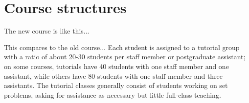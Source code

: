 \documentclass{amsart}
\begin{document}
\section{Course structures}

The new course is like this...

This compares to the old course... Each student is assigned to a tutorial group with a ratio of about 20-30 students per staff member or postgraduate assistant; on some courses, tutorials have 40 students with one staff member and one assistant, while others have 80 students with one staff member and three assistants. The tutorial classes generally consist of students working on set problems, asking for assistance as necessary but little full-class teaching.
\end{document}
